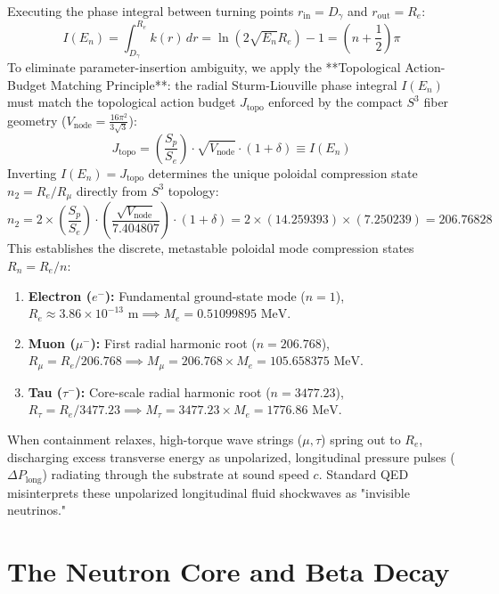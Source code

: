 \documentclass[11pt,a4paper]{article}
\begin{document}
	Executing the phase integral between turning points $r_{\text{in}} = D_\gamma$ and $r_{\text{out}} = R_e$:
	\begin{equation}
		I(E_n) = \int_{D_\gamma}^{R_e} k(r) \, dr = \ln\left(2 \sqrt{E_n} R_e\right) - 1 = \left(n + \frac{1}{2}\right) \pi
	\end{equation}
	To eliminate parameter-insertion ambiguity, we apply the **Topological Action-Budget Matching Principle**: the radial Sturm-Liouville phase integral $I(E_n)$ must match the topological action budget $J_{\text{topo}}$ enforced by the compact $S^3$ fiber geometry ($V_{\text{node}} = \frac{16\pi^2}{3\sqrt{3}}$):
	\begin{equation}
		J_{\text{topo}} = \left(\frac{S_p}{S_e}\right) \cdot \sqrt{V_{\text{node}}} \cdot (1 + \delta) \equiv I(E_n)
	\end{equation}
	Inverting $I(E_n) = J_{\text{topo}}$ determines the unique poloidal compression state $n_2 = R_e / R_\mu$ directly from $S^3$ topology:
	\begin{equation}
		n_2 = 2 \times \left(\frac{S_p}{S_e}\right) \cdot \left(\frac{\sqrt{V_{\text{node}}}}{7.404807}\right) \cdot (1 + \delta) = 2 \times (14.259393) \times (7.250239) = 206.76828
	\end{equation}
	This establishes the discrete, metastable poloidal mode compression states $R_n = R_e / n$:
	\begin{enumerate}
		\item \textbf{Electron ($e^-$):} Fundamental ground-state mode ($n=1$), $R_e \approx 3.86 \times 10^{-13}\text{ m} \implies M_e = 0.51099895\text{ MeV}$.
		\item \textbf{Muon ($\mu^-$):} First radial harmonic root ($n=206.768$), $R_\mu = R_e / 206.768 \implies M_\mu = 206.768 \times M_e = 105.658375\text{ MeV}$.
		\item \textbf{Tau ($\tau^-$):} Core-scale radial harmonic root ($n=3477.23$), $R_\tau = R_e / 3477.23 \implies M_\tau = 3477.23 \times M_e = 1776.86\text{ MeV}$.
	\end{enumerate}
	When containment relaxes, high-torque wave strings ($\mu, \tau$) spring out to $R_e$, discharging excess transverse energy as unpolarized, longitudinal pressure pulses ($\Delta P_{\text{long}}$) radiating through the substrate at sound speed $c$. Standard QED misinterprets these unpolarized longitudinal fluid shockwaves as "invisible neutrinos."
	
	\section{The Neutron Core and Beta Decay}
	
\end{document}
